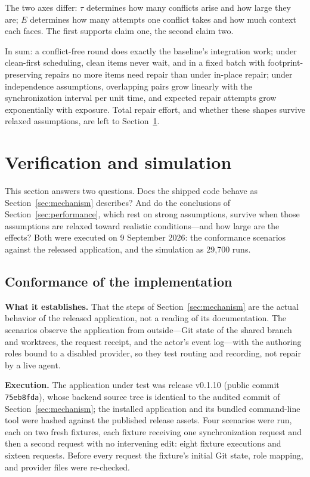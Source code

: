 \documentclass[pdflatex,sn-mathphys-ay]{sn-jnl}
\theoremstyle{thmstyleone}
\theoremstyle{thmstylethree}
\begin{document}
The two axes differ: \(\tau\) determines how many conflicts arise and how large they are; \(E\) determines how many attempts one conflict takes and how much context each faces. The first supports claim one, the second claim two.

In sum: a conflict-free round does exactly the baseline's integration work; under clean-first scheduling, clean items never wait, and in a fixed batch with footprint-preserving repairs no more items need repair than under in-place repair; under independence assumptions, overlapping pairs grow linearly with the synchronization interval per unit time, and expected repair attempts grow exponentially with exposure. Total repair effort, and whether these shapes survive relaxed assumptions, are left to Section~\ref{sec:verification}.
\section{Verification and simulation}\label{sec:verification}

This section answers two questions. Does the shipped code behave as Section~\ref{sec:mechanism} describes? And do the conclusions of Section~\ref{sec:performance}, which rest on strong assumptions, survive when those assumptions are relaxed toward realistic conditions---and how large are the effects? Both were executed on 9 September 2026: the conformance scenarios against the released application, and the simulation as 29,700 runs.

\subsection{Conformance of the implementation}\label{sec:conformance}

\textbf{What it establishes.} That the steps of Section~\ref{sec:mechanism} are the actual behavior of the released application, not a reading of its documentation. The scenarios observe the application from outside---Git state of the shared branch and worktrees, the request receipt, and the actor's event log---with the authoring roles bound to a disabled provider, so they test routing and recording, not repair by a live agent.

\textbf{Execution.} The application under test was release v0.1.10 (public commit \texttt{75eb8fda}), whose backend source tree is identical to the audited commit of Section~\ref{sec:mechanism}; the installed application and its bundled command-line tool were hashed against the published release assets. Four scenarios were run, each on two fresh fixtures, each fixture receiving one synchronization request and then a second request with no intervening edit: eight fixture executions and sixteen requests. Before every request the fixture's initial Git state, role mapping, and provider files were re-checked.
\end{document}
